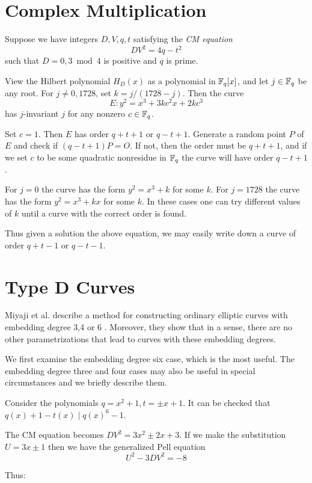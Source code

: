 \section {Complex Multiplication}

Suppose we have integers $D, V, q, t$ satisfying the \emph{CM equation}
\[ D V^2 = 4 q - t^2 \]
such that $D = 0, 3 \bmod 4$ is positive and $q$ is prime.

View the Hilbert polynomial $H_D(x)$ as a polynomial in $\mathbb{F}_q[x]$,
and let $j \in \mathbb{F}_q$ be any root. For $j \ne 0, 1728$, set
$k = j / (1728 - j)$. Then the curve
\[ E: y^2 = x^3 + 3 k c^2 x + 2 k c^3 \]
has $j$-invariant $j$ for any nonzero $c \in \mathbb{F}_q$.

Set $c = 1$. Then $E$ has order $q + t + 1$ or $q - t + 1$.
Generate a random point $P$ of $E$ and check if
$(q-t+1)P = O$. If not, then the order must be $q + t + 1$,
and if we set $c$ to be some quadratic nonresidue in $\mathbb{F}_q$ the
curve will have order $q - t + 1$.

For $j = 0$ the curve has the form $y^2 = x^3 + k$ for some $k$.
For $j = 1728$ the curve has the form $y^2 = x^3 + k x$ for some $k$.
In these cases one can try different values of $k$ until a curve
with the correct order is found.

Thus given a solution the above equation, we may easily write down
a curve of order $q+t-1$ or $q-t-1$.

\section {Type D Curves}

Miyaji et al. describe a method for constructing ordinary elliptic
curves with embedding degree 3,4 or 6 \cite{mnt}. Moreover, they show
that in a sense, there are no other parametrizations that lead to curves
with these embedding degrees.

We first examine the embedding degree six case, which is the most useful.
The embedding degree three and four cases may also be useful in special
circumstances and we briefly describe them.

Consider the polynomials $q = x^2 + 1, t = \pm x + 1$.
It can be checked that $q(x) + 1 - t(x) \mid q(x)^6 - 1$.

The CM equation becomes $D V^2 = 3 x^2 \pm 2 x + 3$. If we make
the substitution $U = 3x \pm 1$ then we have the generalized Pell equation
\[
U^2 - 3DV^2 = -8
\]

Thus:

